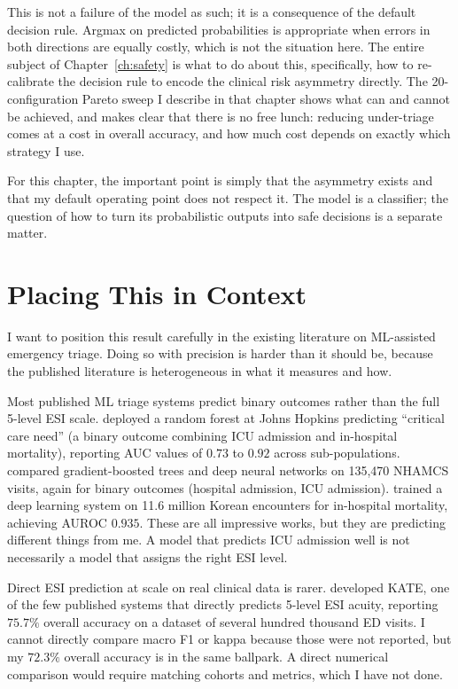 This is not a failure of the model as such; it is a consequence of the default decision rule. Argmax on predicted probabilities is appropriate when errors in both directions are equally costly, which is not the situation here. The entire subject of Chapter~\ref{ch:safety} is what to do about this, specifically, how to re-calibrate the decision rule to encode the clinical risk asymmetry directly. The 20-configuration Pareto sweep I describe in that chapter shows what can and cannot be achieved, and makes clear that there is no free lunch: reducing under-triage comes at a cost in overall accuracy, and how much cost depends on exactly which strategy I use.

For this chapter, the important point is simply that the asymmetry exists and that my default operating point does not respect it. The model is a classifier; the question of how to turn its probabilistic outputs into safe decisions is a separate matter.

\section{Placing This in Context}

I want to position this result carefully in the existing literature on ML-assisted emergency triage. Doing so with precision is harder than it should be, because the published literature is heterogeneous in what it measures and how.

Most published ML triage systems predict binary outcomes rather than the full 5-level ESI scale. \citet{levin2018machine} deployed a random forest at Johns Hopkins predicting ``critical care need'' (a binary outcome combining ICU admission and in-hospital mortality), reporting AUC values of $0.73$ to $0.92$ across sub-populations. \citet{raita2019emergency} compared gradient-boosted trees and deep neural networks on 135,470 NHAMCS visits, again for binary outcomes (hospital admission, ICU admission). \citet{kwon2018deep} trained a deep learning system on 11.6 million Korean encounters for in-hospital mortality, achieving AUROC $0.935$. These are all impressive works, but they are predicting different things from me. A model that predicts ICU admission well is not necessarily a model that assigns the right ESI level.

Direct ESI prediction at scale on real clinical data is rarer. \citet{ivanov2021kate} developed KATE, one of the few published systems that directly predicts 5-level ESI acuity, reporting $75.7\%$ overall accuracy on a dataset of several hundred thousand ED visits. I cannot directly compare macro F1 or kappa because those were not reported, but my $72.3\%$ overall accuracy is in the same ballpark. A direct numerical comparison would require matching cohorts and metrics, which I have not done.

